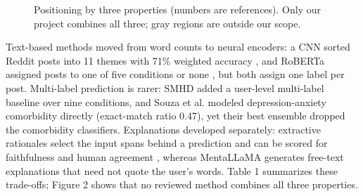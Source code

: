 \documentclass[sigconf]{acmart}
\begin{document}
\begin{figure}[t]
\centering
{}
\caption{Positioning by three properties (numbers are references). Only our project combines all three; gray regions are outside our scope.}
\label{fig:venn}
\end{figure}

Text-based methods moved from word counts \cite{rude2004language} to neural encoders: a CNN sorted Reddit posts into 11 themes with 71\% weighted accuracy \cite{gkotsis2017characterisation}, and RoBERTa assigned posts to one of five conditions or none \cite{murarka2021classification}, but both assign one label per post. Multi-label prediction is rarer: SMHD \cite{cohan2018smhd} added a user-level multi-label baseline over nine conditions, and Souza et al. \cite{souza2021deep} modeled depression-anxiety comorbidity directly (exact-match ratio 0.47), yet their best ensemble dropped the comorbidity classifiers. Explanations developed separately: extractive rationales select the input spans behind a prediction \cite{lei2016rationalizing} and can be scored for faithfulness and human agreement \cite{deyoung2020eraser}, whereas MentaLLaMA \cite{yang2024mentallama} generates free-text explanations that need not quote the user's words. Table 1 summarizes these trade-offs; Figure 2 shows that no reviewed method combines all three properties.
\end{document}
